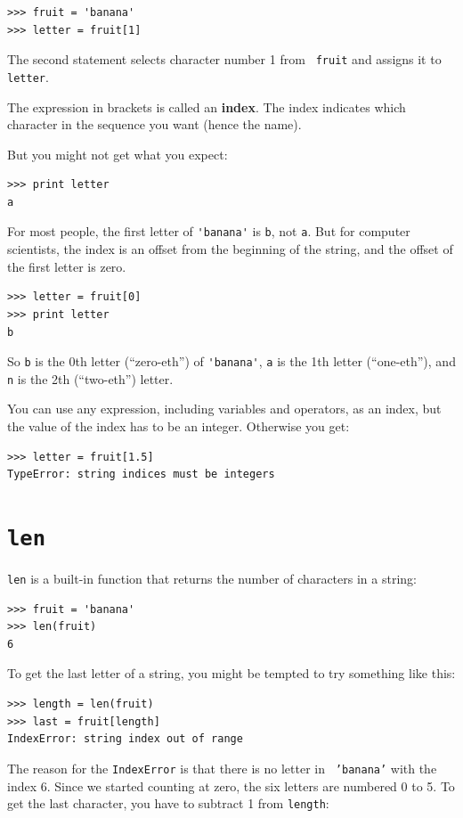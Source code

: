 \documentclass[10pt]{book}
\begin{document}
\begin{CJK}{UTF8}{gbsn}
\begin{verbatim}
>>> fruit = 'banana'
>>> letter = fruit[1]
\end{verbatim}
%
The second statement selects character number 1 from {\tt
fruit} and assigns it to {\tt letter}.  

The expression in brackets is called an {\bf index}.  
The index indicates which character in the sequence you
want (hence the name).

But you might not get what you expect:

\begin{verbatim}
>>> print letter
a
\end{verbatim}
%
For most people, the first letter of \verb"'banana'" is {\tt b}, not
{\tt a}.  But for computer scientists, the index is an offset from the
beginning of the string, and the offset of the first letter is zero.

\begin{verbatim}
>>> letter = fruit[0]
>>> print letter
b
\end{verbatim}
%
So {\tt b} is the 0th letter (``zero-eth'') of \verb"'banana'", {\tt a}
is the 1th letter (``one-eth''), and {\tt n} is the 2th (``two-eth'')
letter.

You can use any expression, including variables and operators, as an
index, but the value of the index has to be an integer.  Otherwise you
get:

\begin{verbatim}
>>> letter = fruit[1.5]
TypeError: string indices must be integers
\end{verbatim}
%

\section{{\tt len}}

{\tt len} is a built-in function that returns the number of characters
in a string:

\begin{verbatim}
>>> fruit = 'banana'
>>> len(fruit)
6
\end{verbatim}
%
To get the last letter of a string, you might be tempted to try something
like this:

\begin{verbatim}
>>> length = len(fruit)
>>> last = fruit[length]
IndexError: string index out of range
\end{verbatim}
%
The reason for the {\tt IndexError} is that there is no letter in {\tt
'banana'} with the index 6.  Since we started counting at zero, the
six letters are numbered 0 to 5.  To get the last character, you have
to subtract 1 from {\tt length}:


\end{CJK}
\end{document}
